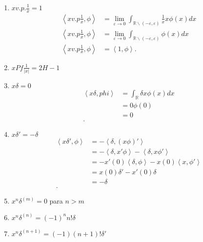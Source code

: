 \documentclass{report}   
\begin{document}
\begin{enumerate}
  \item $x v.p. \frac{1}{x} = 1$ 
    \begin{align*}
      \left<xv.p \frac{1}{x}, \phi \right> &= \lim_{\varepsilon \to 0} \int_{\mathbb{R}\backslash \left( -\varepsilon, \varepsilon \right) } \frac{1}{x}x \phi\left( x \right) dx \\
      \left<xv.p \frac{1}{x}, \phi \right> &= \lim_{\varepsilon \to 0} \int_{\mathbb{R}\backslash \left( -\varepsilon, \varepsilon \right) } \phi\left( x \right) dx \\
      \left<xv.p \frac{1}{x}, \phi \right> &= \left<1, \phi \right>
    .\end{align*}
  \item $x Pf \frac{1}{\left| x \right| } = 2H - 1$
  \item $x\delta = 0$ 
    \begin{align*}
      \left<x\delta, phi \right> &= \int_{\mathbb{R}} \delta x\phi\left( x \right) dx \\
      &= 0\phi\left( 0 \right)  \\
      &= 0 \\
    .\end{align*}
  \item $x\delta' = -\delta$
    \begin{align*}
      \left<x\delta', \phi \right> &= -\left<\delta, \left( x\phi \right)' \right> \\
      &= - \left<\delta, x'\phi \right> - \left<\delta, x\phi' \right> \\
      &= -x'\left( 0 \right) \left<\delta, \phi \right> - x\left( 0 \right) \left<x, \phi' \right>\\
      &= x\left( 0 \right) \delta' - x'\left( 0 \right) \delta \\
      &= -\delta \\
    .\end{align*}
  \item  $x^{n}\delta^{\left( m \right) } = 0$ para $n > m$
  \item  $x^{n}\delta^{\left( n \right) } = \left( -1 \right) ^{n}n!\delta$ 
  \item $x^{n}\delta^{\left( n + 1 \right) } = \left( -1 \right) \left( n + 1 \right)! \delta'$
\end{enumerate}
\end{document}
